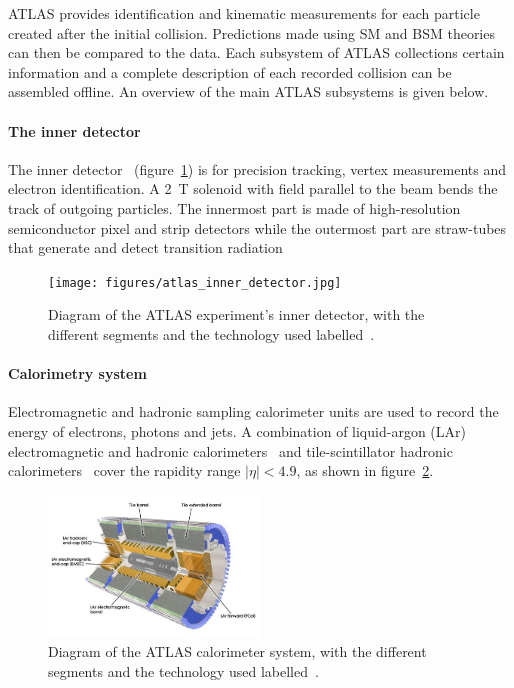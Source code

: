 ATLAS provides identification and kinematic measurements for each particle created after the initial collision. Predictions made using SM and BSM theories can then be compared to the data. Each subsystem of ATLAS collections certain information and a complete description of each recorded collision can be assembled offline. An overview of the main ATLAS subsystems is given below.

\paragraph*{The inner detector} \hfill \break
The inner detector~\cite{atlas_inner_detector_tdr_1, atlas_inner_detector_tdr_2} (figure~\ref{fig:atlas_inner_detector}) is for precision tracking, vertex measurements and electron identification. A \SI{2}{\tesla} solenoid with field parallel to the beam bends the track of outgoing particles. The innermost part is made of high-resolution semiconductor pixel and strip detectors while the outermost part are straw-tubes that generate and detect transition radiation

\begin{figure}
    \centering
    \texttt{[image: figures/atlas\_inner\_detector.jpg]}
    \caption{Diagram of the ATLAS experiment's inner detector, with the different segments and the technology used labelled~\cite{collaboration_atlas_2008}.}
    \label{fig:atlas_inner_detector}
\end{figure}

\paragraph*{Calorimetry system} \hfill \break
Electromagnetic and hadronic sampling calorimeter units are used to record the energy of electrons, photons and jets. A combination of liquid-argon (LAr) electromagnetic and hadronic calorimeters~\cite{atlas_lar_cal_tdr} and tile-scintillator hadronic calorimeters~\cite{atlas_tile_cal_tdr} cover the rapidity range $|\eta| < 4.9$, as shown in figure~\ref{fig:atlas_calorimeter}.

\begin{figure}
    \centering
    \includegraphics[width = 0.5\textwidth]{figures/atlas_calorimeter.png}
    \caption{Diagram of the ATLAS calorimeter system, with the different segments and the technology used labelled~\cite{collaboration_atlas_2008}.}
    \label{fig:atlas_calorimeter}
\end{figure}

